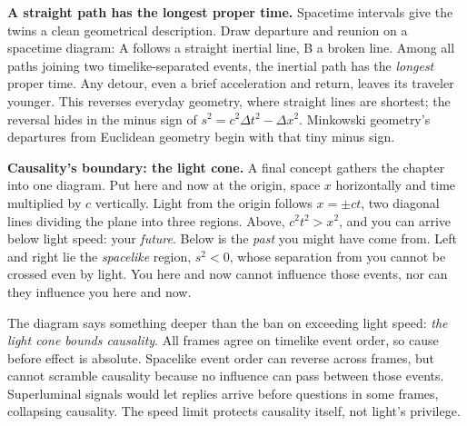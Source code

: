 \begin{challenge}
\textbf{A straight path has the longest proper time.} Spacetime intervals give the twins a clean geometrical description. Draw departure and reunion on a spacetime diagram: A follows a straight inertial line, B a broken line. Among all paths joining two timelike-separated events, the inertial path has the \emph{longest} proper time. Any detour, even a brief acceleration and return, leaves its traveler younger. This reverses everyday geometry, where straight lines are shortest; the reversal hides in the minus sign of \(s^{2}=c^{2}\Delta t^{2}-\Delta x^{2}\). Minkowski geometry's departures from Euclidean geometry begin with that tiny minus sign.
\end{challenge}

\begin{mainline}
\textbf{Causality's boundary: the light cone.} A final concept gathers the chapter into one diagram. Put here and now at the origin, space \(x\) horizontally and time multiplied by \(c\) vertically. Light from the origin follows \(x=\pm ct\), two diagonal lines dividing the plane into three regions. Above, \(c^{2}t^{2}>x^{2}\), and you can arrive below light speed: your \emph{future}. Below is the \emph{past} you might have come from. Left and right lie the \emph{spacelike} region, \(s^{2}<0\), whose separation from you cannot be crossed even by light. You here and now cannot influence those events, nor can they influence you here and now.

\begin{center}
\end{center}

The diagram says something deeper than the ban on exceeding light speed: \emph{the light cone bounds causality}. All frames agree on timelike event order, so cause before effect is absolute. Spacelike event order can reverse across frames, but cannot scramble causality because no influence can pass between those events. Superluminal signals would let replies arrive before questions in some frames, collapsing causality. The speed limit protects causality itself, not light's privilege.
\end{mainline}

